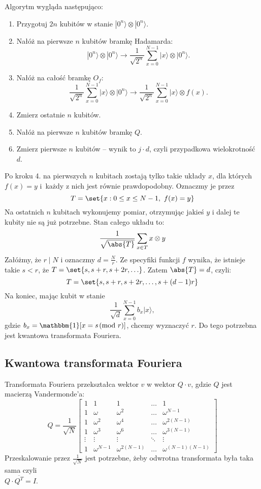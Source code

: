 \newpage
Algorytm wygląda następująco:
\begin{greyframe}
    \begin{enumerate}
    \item Przygotuj \( 2n \) kubitów w stanie \( |0^n\rangle \otimes |0^n\rangle \).
    \item Nałóż na pierwsze \( n \) kubitów bramkę Hadamarda:
    \[
        |0^n\rangle \otimes |0^n\rangle \rightarrow \frac{1}{\sqrt{2^n}} \sum_{x=0}^{N-1} |x\rangle \otimes |0^n\rangle.
    \]
    \item Nałóż na całość bramkę \( O_f \):
    \[
        \frac{1}{\sqrt{2^n}} \sum_{x=0}^{N-1} |x\rangle \otimes |0^n\rangle \rightarrow \frac{1}{\sqrt{2^n}} \sum_{x=0}^{N-1} |x\rangle \otimes f(x).
    \]
    \item Zmierz ostatnie \( n \) kubitów.
    \item Nałóż na pierwsze \( n \) kubitów bramkę \( Q \).
    \item Zmierz pierwsze \( n \) kubitów -- wynik to \( j \cdot d \), czyli przypadkowa wielokrotność \( d \).
    \end{enumerate}
\end{greyframe}
Po kroku 4. na pierwszych \( n \) kubitach zostają tylko takie układy \( x \), dla których \( f(x) = y \) i~każdy z nich jest równie prawdopodobny.
Oznaczmy je przez
\[
    T = \set{x : 0 \leq x \leq N-1,\ f(x) = y}
\]
Na ostatnich \( n \) kubitach wykonujemy pomiar, otrzymując jakieś \( y \) i dalej te kubity nie są już potrzebne. Stan całego układu to:
\[
    \frac{1}{\sqrt{\abs{T}}} \sum_{x \in T} x \otimes y
\]
Załóżmy, że \( r \mid N \) i oznaczmy \( d = \frac{N}{r} \). Ze specyfiki funkcji \( f \) wynika, że istnieje takie \( s < r \), że \( T = \set{s, s + r, s + 2r, \ldots} \). Zatem \( \abs{T} = d \), czyli:
\[
    T = \set{s, s + r, s + 2r, \ldots, s + (d - 1)r}
\]
Na koniec, mając kubit w stanie 
\[
    \frac{1}{\sqrt{d}} \sum_{x=0}^{N-1} b_x |x\rangle,
\]
gdzie \( b_x = \mathbbm{1}[x = s \!\!\pmod{r}] \), chcemy wyznaczyć \( r \). Do tego potrzebna jest kwantowa transformata Fouriera.
\vfill
\newpage
\subsection*{Kwantowa transformata Fouriera}
Transformata Fouriera przekształca wektor \( v \) w wektor \( Q \cdot v \), gdzie \( Q \) jest macierzą Vandermonde'a:
\[
    Q = \frac{1}{\sqrt{N}} \begin{bmatrix}
        1 & 1 & 1 & \ldots & 1 \\
        1 & \omega & \omega^2 & \ldots & \omega^{N-1} \\
        1 & \omega^2 & \omega^4 & \ldots & \omega^{2(N-1)} \\
        1 & \omega^3 & \omega^6 & \ldots & \omega^{3(N-1)} \\
        \vdots & \vdots & \vdots & \ddots & \vdots \\
        1 & \omega^{N-1} & \omega^{2(N-1)} & \ldots & \omega^{(N-1)(N-1)}
    \end{bmatrix}
\]
Przeskalowanie przez \( \frac{1}{\sqrt{N}} \) jest potrzebne, żeby odwrotna transformata była taka sama czyli \\ \( Q \cdot \overline{Q^T} = I \).

